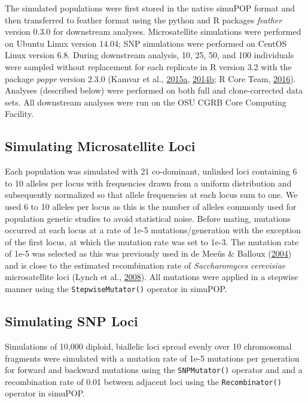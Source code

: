 \documentclass[double,11pt]{beavtex}
\begin{document}
  The simulated populations were first stored in the native simuPOP format
  and then transferred to feather format using the python and R packages
  \emph{feather} version 0.3.0 for downstream analyses. Microsatellite
  simulations were performed on Ubuntu Linux version 14.04; SNP
  simulations were performed on CentOS Linux version 6.8. During
  downstream analysis, 10, 25, 50, and 100 individuals were sampled
  without replacement for each replicate in R version 3.2 with the package
  \emph{poppr} version 2.3.0 (Kamvar et al.,
  \protect\hyperlink{ref-kamvar2015novel}{2015}\protect\hyperlink{ref-kamvar2015novel}{a},
  \protect\hyperlink{ref-kamvar2014poppr}{2014}\protect\hyperlink{ref-kamvar2014poppr}{b};
  R Core Team, \protect\hyperlink{ref-R2016}{2016}). Analyses (described
  below) were performed on both full and clone-corrected data sets. All
  downstream analyses were run on the OSU CGRB Core Computing Facility.
  
  \subsection{Simulating Microsatellite
  Loci}\label{simulating-microsatellite-loci}
  
  Each population was simulated with 21 co-dominant, unlinked loci
  containing 6 to 10 alleles per locus with frequencies drawn from a
  uniform distribution and subsequently normalized so that allele
  frequencies at each locus sum to one. We used 6 to 10 alleles per locus
  as this is the number of alleles commonly used for population genetic
  studies to avoid statistical noise. Before mating, mutations occurred at
  each locus at a rate of 1e-5 mutations/generation with the exception of
  the first locus, at which the mutation rate was set to 1e-3. The
  mutation rate of 1e-5 was selected as this was previously used in de
  Meeûs \& Balloux (\protect\hyperlink{ref-de2004clonal}{2004}) and is
  close to the estimated recombination rate of \emph{Saccharomyces
  cerevisiae} microsatellite loci (Lynch et al.,
  \protect\hyperlink{ref-lynch2008genome}{2008}). All mutations were
  applied in a stepwise manner using the \texttt{StepwiseMutator()}
  operator in simuPOP.
  
  \subsection{Simulating SNP Loci}\label{simulating-snp-loci}
  
  Simulations of 10,000 diploid, biallelic loci spread evenly over 10
  chromosomal fragments were simulated with a mutation rate of 1e-5
  mutations per generation for forward and backward mutations using the
  \texttt{SNPMutator()} operator and and a recombination rate of 0.01
  between adjacent loci using the \texttt{Recombinator()} operator in
  simuPOP.
  
\end{document}
